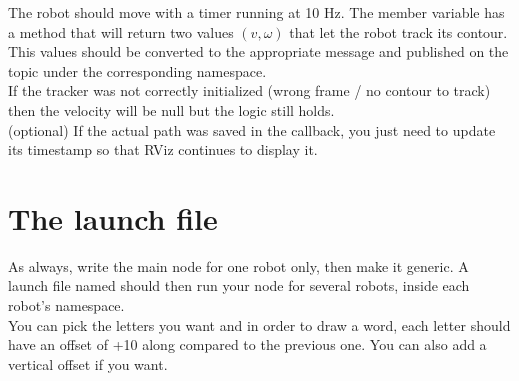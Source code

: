 \documentclass{ecnreport}
\begin{document}
The robot should move with a timer running at 10 Hz. The  member variable has a  method that will return two values $(v,\omega)$ that let the robot track its contour.\\

This values should be converted to the appropriate message and published on the  topic under the corresponding namespace.\\

If the tracker was not correctly initialized (wrong frame / no contour to track) then the velocity will be null but the logic still holds.\\

(optional) If the actual path was saved in the callback, you just need to update its timestamp so that RViz continues to display it.


\section{The launch file}

As always, write the main node for one robot only, then make it generic. A launch file named  should then run your node for several robots, inside each robot's namespace.\\

You can pick the letters you want and in order to draw a word, each letter should have an offset of +10 along  compared to the previous one. You can also add a vertical offset if you want.
\end{document}
